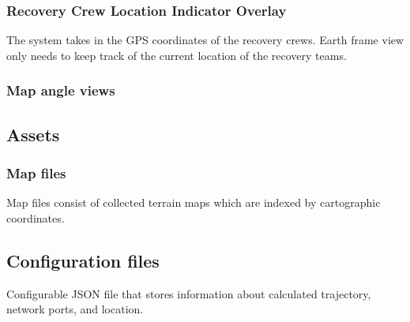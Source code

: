 \subsubsection{Recovery Crew Location Indicator Overlay}
   The system takes in the GPS coordinates of the recovery crews. Earth frame
   view only needs to keep track of the current location of the recovery teams.

\subsubsection{Map angle views}

\subsection{Assets}

\subsubsection{Map files}
  Map files consist of collected terrain maps which are indexed by cartographic
  coordinates.

\subsection{Configuration files}
  Configurable JSON file that stores information about calculated trajectory,
  network ports, and location.

